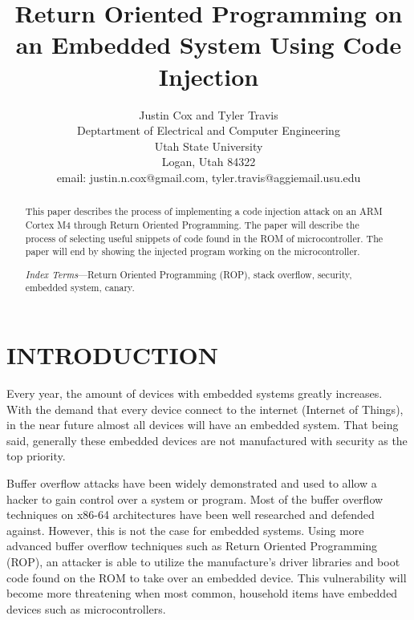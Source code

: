 \documentclass[letterpaper, 10 pt, conference]{ieeeconf}  %
\title{\LARGE \bf
Return Oriented Programming on an Embedded System Using Code Injection
}
\author{Justin Cox and Tyler Travis
\\ \small{Deptartment of Electrical and Computer Engineering}
\\ \small{Utah State University}
\\ \small{Logan, Utah 84322}
\\ \small{email: justin.n.cox@gmail.com, tyler.travis@aggiemail.usu.edu}
}
\begin{document}
\maketitle
\thispagestyle{empty}
\pagestyle{empty}


\begin{abstract}

This paper describes the process of implementing a code injection attack on an ARM Cortex M4 through Return Oriented Programming.  The paper will describe the process of selecting useful snippets of code found in the ROM of microcontroller.  The paper will end by showing the injected program working on the microcontroller.  

\emph{Index Terms}---Return Oriented Programming (ROP), stack overflow, security, embedded system, canary.    

\end{abstract}

\section{INTRODUCTION}

Every year, the amount of devices with embedded systems greatly increases.  With the demand that every device connect to the internet (Internet of Things), in the near future almost all devices will have an embedded system.  That being said, generally these embedded devices are not manufactured with security as the top priority.

Buffer overflow attacks have been widely demonstrated and used to allow a hacker to gain control over a system or program.  Most of the buffer overflow techniques on x86-64 architectures have been well researched and defended against.  However, this is not the case for embedded systems.  Using more advanced buffer overflow techniques such as Return Oriented Programming (ROP), an attacker is able to utilize the manufacture's driver libraries and boot code found on the ROM to take over an embedded device.  This vulnerability will become more threatening when most common, household items have embedded devices such as microcontrollers.       

 
\end{document}

